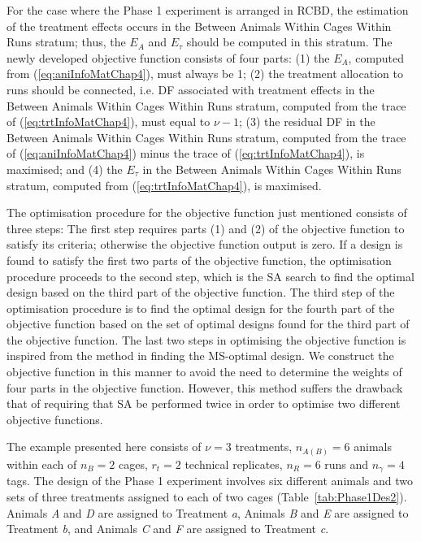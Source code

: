 For the case where the Phase 1 experiment is arranged in RCBD, the estimation of the treatment effects occurs in the Between Animals Within Cages Within Runs stratum; thus, the $E_A$ and $E_\tau$ should be computed in this stratum. The newly developed objective function consists of four parts: (1) the $E_A$, computed from (\ref{eq:aniInfoMatChap4}), must always be 1; (2) the treatment allocation to runs should be connected, i.e. DF associated with treatment effects in the Between Animals Within Cages Within Runs stratum, computed from the trace of (\ref{eq:trtInfoMatChap4}), must equal to $\nu - 1$; (3) the residual DF in the Between Animals Within Cages Within Runs stratum, computed from the trace of (\ref{eq:aniInfoMatChap4}) minus the trace of (\ref{eq:trtInfoMatChap4}), is maximised; and (4) the $E_\tau$ in the Between Animals Within Cages Within Runs stratum, computed from (\ref{eq:trtInfoMatChap4}), is maximised. 

The optimisation procedure for the objective function just mentioned consists of three steps: The first step requires parts (1) and (2) of the objective function to satisfy its criteria; otherwise the objective function output is zero. If a design is found to satisfy the first two parts of the objective function, the optimisation procedure proceeds to the second step, which is the SA search to find the optimal design based on the third part of the objective function. The third step of the optimisation procedure is to find the optimal design for the fourth part of the objective function based on the set of optimal designs found for the third part of the objective function. The last two steps in optimising the objective function is inspired from the method in finding the MS-optimal design. We construct the objective function in this manner to avoid the need to determine the weights of four parts in the objective function. However, this method suffers the drawback that of requiring that SA be performed twice in order to optimise two different objective functions. 

The example presented here consists of $\nu = 3$ treatments, $n_{A(B)} = 6$ animals within each of $n_B = 2$ cages, $r_t = 2$ technical replicates, $n_R = 6$ runs and $n_\gamma = 4$ tags. The design of the Phase 1 experiment involves six different animals and two sets of three treatments assigned to each of two cages (Table~\ref{tab:Phase1Des2}). Animals \textit{A} and \textit{D} are assigned to Treatment \textit{a}, Animals \textit{B} and \textit{E} are assigned to Treatment \textit{b}, and Animals \textit{C} and \textit{F} are assigned to Treatment \textit{c}.

